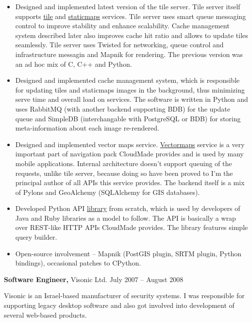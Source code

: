 \documentclass[margin]{res}
\begin{document}
\begin{resume}
\begin{itemize} \itemsep -1pt
\item Designed and implemented latest version of the tile
  server. Tile server itself supports
  \href{http://developers.cloudmade.com/projects/show/tiles}{tile} and
  \href{http://developers.cloudmade.com/projects/show/static-maps}{staticmaps}
  services.
  Tile server uses smart queue messaging control
  to improve stability and enhance scalability. Cache management system
  described later also improves cache hit ratio and
  allows to update tiles seamlessly. Tile server uses
  Twisted for networking, queue control and infrastructure messagin
  and Mapnik for rendering.
  The previous version was an ad hoc mix of C, C++ and Python.
\item Designed and implemented cache management system, which is
  responsible for updating tiles and staticmaps images in the
  background, thus minimizing serve time and overall load on
  services. The software is written in Python and uses RabbitMQ
  (with another backend supporting BDB) for the update queue and
  SimpleDB (interchangable with PostgreSQL or BDB) for storing
  meta-information about each image re-rendered.
\item Designed and implemented vector maps service.
  \href{http://developers.cloudmade.com/projects/show/vector-stream-server}{Vectormaps}
  service is a very important part of
  navigation pack CloudMade provides and is used by many
  mobile applications.
  Internal architecture doesn't support queuing of the requests, unlike
  tile server, because doing so have been proved to
  I'm the principal author of all APIs this service
  provides. The backend itself is a mix of Pylons
  and GeoAlchemy (SQLAlchemy for GIS databases).
\item Developed Python API
  \href{http://developers.cloudmade.com/projects/show/python-lib}{library}
  from scratch,
  which is  used by developers of Java and Ruby
  libraries as a model to follow. The API is basically a wrap over
  REST-like HTTP APIs CloudMade provides. The library features simple
  query builder.
\item Open-source involvement -- Mapnik
  (PostGIS plugin, SRTM plugin,
  Python bindings), occasional patches to CPython.
\end{itemize}

{\bf Software Engineer,} Visonic Ltd. \hfill July 2007 -- August 2008

Visonic is an Israel-based manufacturer of security systems.
I was responsible for supporting legacy desktop software and
also got involved into development of several web-based
products.\\


\end{resume}
\end{document}
